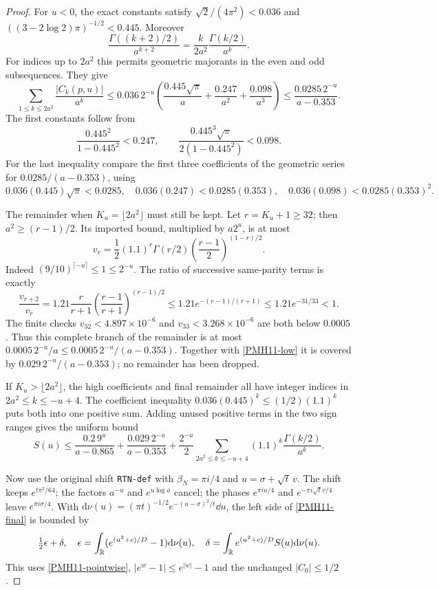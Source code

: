 \begin{proof}
For $u<0$, the exact constants satisfy
$\sqrt2/(4\pi^2)<0.036$ and
$((3-2\log2)\pi)^{-1/2}<0.445$. Moreover
\[
 \frac{\Gamma((k+2)/2)}{a^{k+2}}
 =\frac{k}{2a^2}\frac{\Gamma(k/2)}{a^k}.
\]
For indices up to $2a^2$ this permits geometric majorants in the
even and odd subsequences. They give
\begin{equation}\label{PMH11-low}
 \sum_{1\le k\le2a^2}\frac{|C_k(p,u)|}{a^k}
 \le0.036\,2^{-u}
 \left(\frac{0.445\sqrt\pi}{a}+\frac{0.247}{a^2}
                         +\frac{0.098}{a^3}\right)
 \le\frac{0.0285\,2^{-u}}{a-0.353}.
\end{equation}
The first constants follow from
\[
 \frac{0.445^2}{1-0.445^2}<0.247,\qquad
 \frac{0.445^3\sqrt\pi}{2(1-0.445^2)}<0.098.
\]
For the last inequality compare the first three coefficients of
the geometric series for $0.0285/(a-0.353)$, using
\[
 0.036(0.445)\sqrt\pi<0.0285,\quad
 0.036(0.247)<0.0285(0.353),\quad
 0.036(0.098)<0.0285(0.353)^2.
\]

The remainder when $K_u=\lfloor2a^2\rfloor$ must still be kept.
Let $r=K_u+1\ge32$; then $a^2\ge(r-1)/2$. Its imported bound,
multiplied by $a2^u$, is at most
\[
 v_r=\frac12(1.1)^r\Gamma(r/2)
       \left(\frac{r-1}{2}\right)^{(1-r)/2}.
\]
Indeed $(9/10)^{\lceil-u\rceil}\le1\le2^{-u}$.
The ratio of successive same-parity terms is exactly
\[
 \frac{v_{r+2}}{v_r}=1.21\frac r{r+1}
       \left(\frac{r-1}{r+1}\right)^{(r-1)/2}
 \le1.21e^{-(r-1)/(r+1)}\le1.21e^{-31/33}<1.
\]
The finite checks $v_{32}<4.897\times10^{-6}$ and
$v_{33}<3.268\times10^{-6}$ are both below $0.0005$.
Thus this complete branch of the remainder is at most
$0.0005\,2^{-u}/a\le0.0005\,2^{-u}/(a-0.353)$.
Together with \eqref{PMH11-low} it is covered by
$0.029\,2^{-u}/(a-0.353)$; no remainder has been dropped.

If $K_u>\lfloor2a^2\rfloor$, the high coefficients and final
remainder all have integer indices in $2a^2\le k\le-u+4$.
The coefficient inequality $0.036(0.445)^k\le(1/2)(1.1)^k$
puts both into one positive sum. Adding unused positive terms in
the two sign ranges gives the uniform bound
\begin{equation}\label{PMH11-S}
 S(u)\le\frac{0.2\,9^u}{a-0.865}+\frac{0.029\,2^{-u}}{a-0.353}
       +\frac{2^{-u}}2
          \sum_{2a^2\le k\le-u+4}(1.1)^k\frac{\Gamma(k/2)}{a^k}.
\end{equation}

Now use the original shift \texttt{RTN-def} with $\beta_N=\pi i/4$
and $u=\sigma+\sqrt t\,v$. The shift keeps $e^{t\pi^2/64}$;
the factors $a^{-u}$ and $e^{u\log a}$ cancel; the phases
$e^{\pi iu/4}$ and $e^{-\pi i\sqrt t v/4}$ leave
$e^{\pi i\sigma/4}$. With
$\mathrm d\nu(u)=(\pi t)^{-1/2}e^{-(u-\sigma)^2/t}\dd u$,
the left side of \eqref{PMH11-final} is bounded by
\begin{equation}\label{PMH11-epsdelta}
 \tfrac12\epsilon+\delta,\quad
 \epsilon=\int_\mathbb R(e^{(u^2+c)/D}-1)\mathrm d\nu(u),\quad
 \delta=\int_\mathbb R e^{(u^2+c)/D}S(u)\mathrm d\nu(u).
\end{equation}
This uses \eqref{PMH11-pointwise}, $|e^w-1|\le e^{|w|}-1$ and
the unchanged $|C_0|\le1/2$.


\end{proof}
